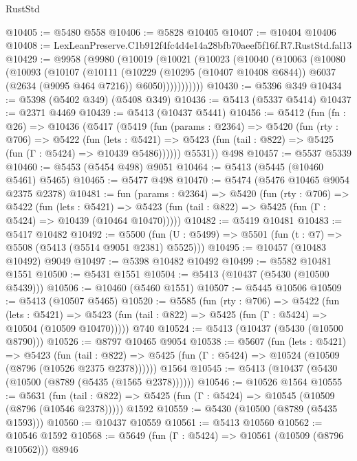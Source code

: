 \begin{lexlean}{RustStd}
\begin{coremodule}
@10405 := @5480 @558
@10406 := @5828 @10405
@10407 := @10404 @10406
@10408 := LexLeanPreserve.C1b912f4fc4d4e14a28bfb70aeef5f16f.R7.RustStd.fal13
@10429 := @9958
    (@9980
      (@10019
        (@10021
          (@10023
            (@10040
              (@10063
                (@10080
                  (@10093
                    (@10107
                      (@10111
                        (@10229
                          (@10295 (@10407 @10408 @6844))
                          @6037
                          (@2634 (@9095 @464 @7216))
                          @6050)))))))))))
@10430 := @5396 @349
@10434 := @5398 (@5402 @349) (@5408 @349)
@10436 := @5413 (@5337 @5414)
@10437 := @2371 @4469
@10439 := @5413 (@10437 @5441)
@10456 := @5412
    (fun (fn : @26) =>
    @10436
      (@5417
        (@5419
          (fun (params : @2364) =>
          @5420
            (fun (rty : @706) =>
            @5422
              (fun (lets : @5421) =>
              @5423 (fun (tail : @822) => @5425 (fun (Γ : @5424) => @10439 @5486))))))
        @5531))
    @498
@10457 := @5537 @5339
@10460 := @5453 (@5454 @498) @9051
@10464 := @5413 (@5445 (@10460 @5461) @5465)
@10465 := @5477 @498
@10470 := @5474 (@5476 @10465 @9054 @2375 @2378)
@10481 := fun (params : @2364) =>
  @5420
    (fun (rty : @706) =>
    @5422
      (fun (lets : @5421) =>
      @5423 (fun (tail : @822) => @5425 (fun (Γ : @5424) => @10439 (@10464 @10470)))))
@10482 := @5419 @10481
@10483 := @5417 @10482
@10492 := @5500 (fun (U : @5499) => @5501 (fun (t : @7) => @5508 (@5413 (@5514 @9051 @2381) @5525)))
@10495 := @10457 (@10483 @10492) @9049
@10497 := @5398 @10482 @10492
@10499 := @5582 @10481 @1551
@10500 := @5431 @1551
@10504 := @5413 (@10437 (@5430 (@10500 @5439)))
@10506 := @10460 (@5460 @1551)
@10507 := @5445 @10506
@10509 := @5413 (@10507 @5465)
@10520 := @5585
    (fun (rty : @706) =>
    @5422
      (fun (lets : @5421) =>
      @5423 (fun (tail : @822) => @5425 (fun (Γ : @5424) => @10504 (@10509 @10470)))))
    @740
@10524 := @5413 (@10437 (@5430 (@10500 @8790)))
@10526 := @8797 @10465 @9054
@10538 := @5607
    (fun (lets : @5421) =>
    @5423
      (fun (tail : @822) =>
      @5425 (fun (Γ : @5424) => @10524 (@10509 (@8796 (@10526 @2375 @2378))))))
    @1564
@10545 := @5413 (@10437 (@5430 (@10500 (@8789 (@5435 (@1565 @2378))))))
@10546 := @10526 @1564
@10555 := @5631
    (fun (tail : @822) => @5425 (fun (Γ : @5424) => @10545 (@10509 (@8796 (@10546 @2378)))))
    @1592
@10559 := @5430 (@10500 (@8789 (@5435 @1593)))
@10560 := @10437 @10559
@10561 := @5413 @10560
@10562 := @10546 @1592
@10568 := @5649 (fun (Γ : @5424) => @10561 (@10509 (@8796 @10562))) @8946

\end{coremodule}
\end{lexlean}
